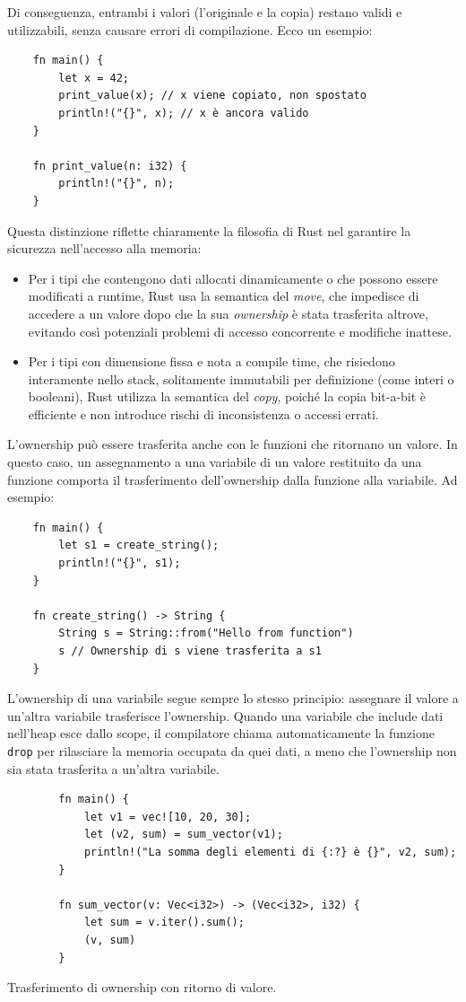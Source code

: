 Di conseguenza, entrambi i valori (l'originale e la copia) restano validi e utilizzabili, senza causare errori di compilazione. Ecco un esempio:
\begin{verbatim}
    fn main() {
        let x = 42;
        print_value(x); // x viene copiato, non spostato
        println!("{}", x); // x è ancora valido
    }

    fn print_value(n: i32) {
        println!("{}", n);
    }
\end{verbatim}
Questa distinzione riflette chiaramente la filosofia di Rust nel garantire la sicurezza nell'accesso alla memoria:
\begin{itemize}
    \item Per i tipi che contengono dati allocati dinamicamente o che possono essere modificati a runtime, Rust usa la semantica del \textit{move}, che impedisce di accedere a un valore dopo che la sua \textit{ownership} è stata trasferita altrove, evitando così potenziali problemi di accesso concorrente e modifiche inattese.
    \item Per i tipi con dimensione fissa e nota a compile time, che risiedono interamente nello stack, solitamente immutabili per definizione (come interi o booleani), Rust utilizza la semantica del \textit{copy}, poiché la copia bit-a-bit è efficiente e non introduce rischi di inconsistenza o accessi errati.
\end{itemize}
L'ownership può essere trasferita anche con le funzioni che ritornano un valore. In questo caso, un assegnamento a una variabile di un valore restituito da una funzione comporta il trasferimento dell'ownership dalla funzione alla variabile. Ad esempio:
\begin{verbatim}
    fn main() {
        let s1 = create_string(); 
        println!("{}", s1);
    }

    fn create_string() -> String {
        String s = String::from("Hello from function")
        s // Ownership di s viene trasferita a s1
    }
\end{verbatim}
L'ownership di una variabile segue sempre lo stesso principio: assegnare il valore a un'altra variabile trasferisce l'ownership. Quando una variabile che include dati nell'heap esce dallo scope, il compilatore chiama automaticamente la funzione \texttt{drop} per rilasciare la memoria occupata da quei dati, a meno che l'ownership non sia stata trasferita a un'altra variabile.
\begin{listing}[H]
    \begin{verbatim}
        fn main() {
            let v1 = vec![10, 20, 30];
            let (v2, sum) = sum_vector(v1); 
            println!("La somma degli elementi di {:?} è {}", v2, sum);
        }

        fn sum_vector(v: Vec<i32>) -> (Vec<i32>, i32) {
            let sum = v.iter().sum();
            (v, sum)
        }
    \end{verbatim}
    \caption{Trasferimento di ownership con ritorno di valore.}
    \label{lst:ownership-return}
\end{listing}

